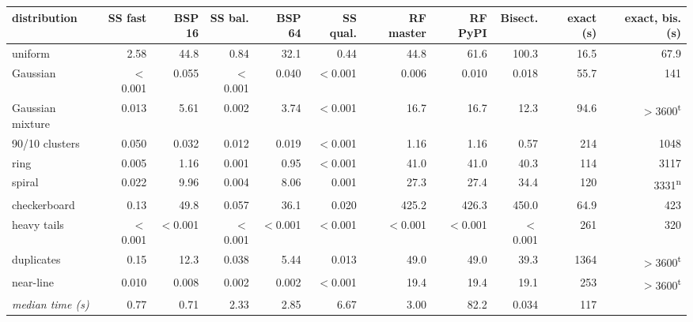 \begin{tabular}{lrrrrrrrrrr}
\toprule
distribution & SS fast & BSP 16 & SS bal. & BSP 64 & SS qual. & RF master & RF PyPI & Bisect. & exact (s) & exact, bis. (s) \\
\midrule
uniform & 2.58 & 44.8 & 0.84 & 32.1 & 0.44 & 44.8 & 61.6 & 100.3 & 16.5 & 67.9 \\
Gaussian & $<$0.001 & 0.055 & $<$0.001 & 0.040 & $<$0.001 & 0.006 & 0.010 & 0.018 & 55.7 & 141 \\
Gaussian mixture & 0.013 & 5.61 & 0.002 & 3.74 & $<$0.001 & 16.7 & 16.7 & 12.3 & 94.6 & $>$3600\textsuperscript{t} \\
90/10 clusters & 0.050 & 0.032 & 0.012 & 0.019 & $<$0.001 & 1.16 & 1.16 & 0.57 & 214 & 1048 \\
ring & 0.005 & 1.16 & 0.001 & 0.95 & $<$0.001 & 41.0 & 41.0 & 40.3 & 114 & 3117 \\
spiral & 0.022 & 9.96 & 0.004 & 8.06 & 0.001 & 27.3 & 27.4 & 34.4 & 120 & 3331\textsuperscript{n} \\
checkerboard & 0.13 & 49.8 & 0.057 & 36.1 & 0.020 & 425.2 & 426.3 & 450.0 & 64.9 & 423 \\
heavy tails & $<$0.001 & $<$0.001 & $<$0.001 & $<$0.001 & $<$0.001 & $<$0.001 & $<$0.001 & $<$0.001 & 261 & 320 \\
duplicates & 0.15 & 12.3 & 0.038 & 5.44 & 0.013 & 49.0 & 49.0 & 39.3 & 1364 & $>$3600\textsuperscript{t} \\
near-line & 0.010 & 0.008 & 0.002 & 0.002 & $<$0.001 & 19.4 & 19.4 & 19.1 & 253 & $>$3600\textsuperscript{t} \\
\midrule
\emph{median time (s)} & 0.77 & 0.71 & 2.33 & 2.85 & 6.67 & 3.00 & 82.2 & 0.034 & 117 &  \\
\bottomrule
\end{tabular}
